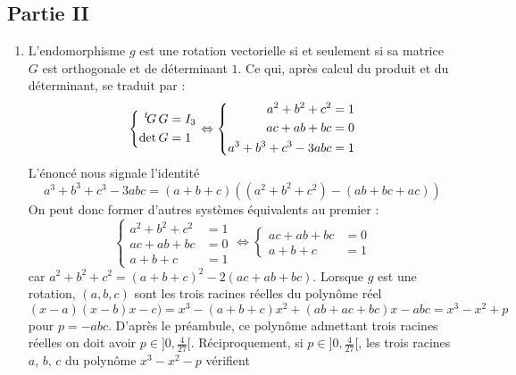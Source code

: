 \subsection*{Partie II}
\begin{enumerate}
 \item L'endomorphisme $g$ est une rotation vectorielle si et seulement si sa matrice $G$ est orthogonale et de déterminant $1$. Ce qui, après calcul du produit et du déterminant, se traduit par :
\begin{displaymath}
 \left\lbrace 
\begin{aligned}
 \mathstrut^t\! G\,G &= I_3 \\
\det G &= 1
\end{aligned}
\right. 
\Leftrightarrow
\left\lbrace 
\begin{aligned}
 a^2+b^2+c^2 &= 1 \\
ac +ab+bc &= 0 \\
a^3 + b^3 + c^3 -3abc &= 1
\end{aligned}
\right. 
\end{displaymath}
L'énoncé nous signale l'identité
\begin{displaymath}
 a^3 + b^3 + c^3 -3abc = (a+b+c)\left( (a^2+b^2+c^2)-(ab+bc+ac)\right) 
\end{displaymath}
On peut donc former d'autres systèmes équivalents au premier :
\begin{displaymath}
 \left\lbrace 
\begin{aligned}
  a^2+b^2+c^2 &= 1 \\
ac +ab+bc &= 0 \\
a+b+c &= 1
\end{aligned}
\right. 
\Leftrightarrow
\left\lbrace 
\begin{aligned}
ac +ab+bc &= 0 \\
a+b+c &= 1
\end{aligned}
\right. 
\end{displaymath}
car $a^2+b^2+c^2=(a+b+c)^2-2(ac+ab+bc)$.\newline
Lorsque $g$ est une rotation, $(a,b,c)$ sont les trois racines réelles du polynôme réel 
\begin{displaymath}
 (x-a)(x-b)x-c)= x^3 -(a+b+c)x^2+(ab+ac+bc)x-abc=x^3-x^2+p
\end{displaymath}
pour $p=-abc$. D'après le préambule, ce polynôme admettant trois racines réelles on doit avoir $p\in ]0,\frac{4}{27}[$.\newline
Réciproquement, si $p\in ]0,\frac{4}{27}[$, les trois racines $a$, $b$, $c$ du polynôme $x^3-x^2-p$ vérifient

\end{enumerate}
